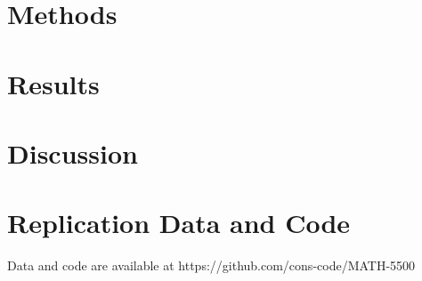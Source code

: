 \documentclass[10pt]{article}
\begin{document}
\section{Methods}

\section{Results}

\section{Discussion}

%

\appendix

\section{Replication Data and Code}
\label{a:code}
Data and code are available at https://github.com/cons-code/MATH-5500
\end{document}
